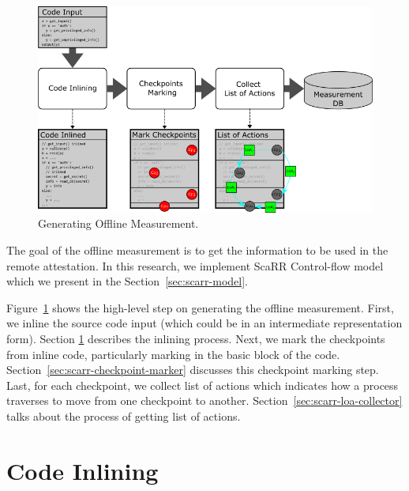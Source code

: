 \begin{figure}[t]
    \centerline{\includegraphics[scale=.75]{Figures/04/scarr-overview.png}}
    \caption{Generating Offline Measurement.}
    \label{fig:scarr-overview}
\end{figure}

The goal of the offline measurement is to get the information to be used in the
remote attestation. In this research, we implement ScaRR Control-flow
model~\cite{toffaliniScaRRScalableRuntime2019} which we present in the
Section~\ref{sec:scarr-model}. 

Figure~\ref{fig:scarr-overview} shows the high-level step on generating the
offline measurement. First, we inline the source code input (which could be in
an intermediate representation form). Section \ref{sec:code-inlining} describes
the inlining process. Next, we mark the checkpoints from inline code,
particularly marking in the basic block of the code.
Section~\ref{sec:scarr-checkpoint-marker} discusses this checkpoint marking
step. Last, for each checkpoint, we collect list of actions which indicates how
a process traverses to move from one checkpoint to another.
Section~\ref{sec:scarr-loa-collector} talks about the process of getting list of
actions.

\section{Code Inlining}
\label{sec:code-inlining}


